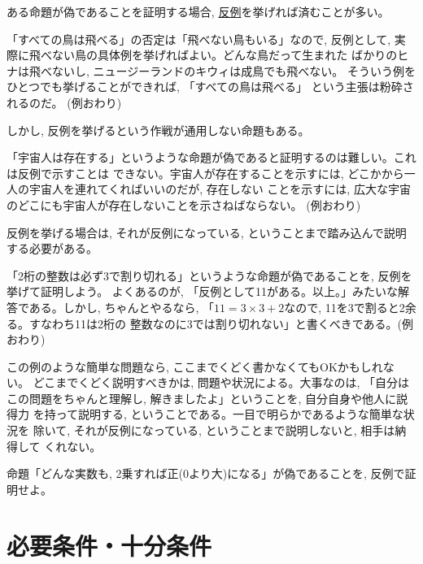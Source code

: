ある命題が偽であることを証明する場合, \underline{反例}を挙げれば済むことが多い。

\begin{exmpl}
「すべての鳥は飛べる」の否定は「飛べない鳥もいる」なので, 反例として, 
実際に飛べない鳥の具体例を挙げればよい。どんな鳥だって生まれた
ばかりのヒナは飛べないし, ニュージーランドのキウィは成鳥でも飛べない。
そういう例をひとつでも挙げることができれば, 「すべての鳥は飛べる」
という主張は粉砕されるのだ。
(例おわり)\end{exmpl}
\mv

しかし, 反例を挙げるという作戦が通用しない命題もある。\\
\begin{exmpl}
「宇宙人は存在する」というような命題が偽であると証明するのは難しい。これは反例で示すことは
できない。宇宙人が存在することを示すには, どこかから一人の宇宙人を連れてくればいいのだが, 存在しない
ことを示すには, 広大な宇宙のどこにも宇宙人が存在しないことを示さねばならない。
(例おわり)\end{exmpl}
\mv

反例を挙げる場合は, それが反例になっている, ということまで踏み込んで説明する必要がある。

\begin{exmpl}
「2桁の整数は必ず3で割り切れる」というような命題が偽であることを, 反例を挙げて証明しよう。
よくあるのが, 「反例として11がある。以上。」みたいな解答である。しかし, 
ちゃんとやるなら, 「$11=3\times3+2$なので, 11を3で割ると2余る。すなわち11は2桁の
整数なのに3では割り切れない」と書くべきである。(例おわり)\end{exmpl}

この例のような簡単な問題なら, ここまでくどく書かなくてもOKかもしれない。
どこまでくどく説明すべきかは, 問題や状況による。大事なのは, 「自分は
この問題をちゃんと理解し, 解きましたよ」ということを, 自分自身や他人に説得力
を持って説明する, ということである。一目で明らかであるような簡単な状況を
除いて, それが反例になっている, ということまで説明しないと, 相手は納得して
くれない。\\

\begin{q}\label{q:logic_square0}
命題「どんな実数も, 2乗すれば正(0より大)になる」が偽であることを, 反例で証明せよ。
\end{q}
\vv



\section{必要条件・十分条件}


